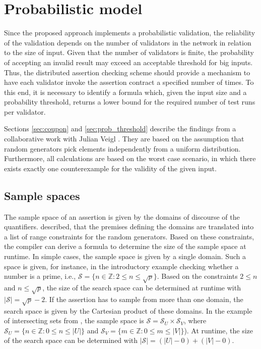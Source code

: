 \chapter{Probabilistic model}\label{chap:prob_model}
Since the proposed approach implements a probabilistic validation, the reliability of the validation depends on the number of validators in the network in relation to the size of input. Given that the number of validators is finite, the probability of accepting an invalid result may exceed an acceptable threshold for big inputs. Thus, the distributed assertion checking scheme should provide a mechanism to have each validator invoke the assertion contract a specified number of times. To this end, it is necessary to identify a formula which, given the input size and a probability threshold, returns a lower bound for the required number of test runs per validator. 

Sections \ref{sec:coupon} and \ref{sec:prob_threshold} describe the findings from a collaborative work with Julian Veigl \cite{bernhardt_veigel_2020}. They are based on the assumption that random generators pick elements independently from a uniform distribution. Furthermore, all calculations are based on the worst case scenario, in which there exists exactly one counterexample for the validity of the given input.

\section{Sample spaces}
The sample space of an assertion is given by the domains of discourse of the quantifiers.  described, that the premises defining the domains are translated into a list of range constraints for the random generators. Based on these constraints, the compiler can derive a formula to determine the size of the sample space at runtime. In simple cases, the sample space is given by a single domain. Such a space is given, for instance, in the introductory example checking whether a number is a prime, i.e., $\mathcal{S} = \lbrace n \in\mathbb{Z} : 2 \le n \le \sqrt{p} \rbrace$. Based on the constraints $2 \le n$ and $n \le \sqrt{p}$, the size of the search space can be determined at runtime with $|\mathcal{S}| = \sqrt{p} - 2$. If the assertion has to sample from more than one domain, the search space is given by the Cartesian product of these domains. In the example of intersecting sets from , the sample space is $\mathcal{S} = \mathcal{S}_U \times \mathcal{S}_V$, where $\mathcal{S}_U = \lbrace n \in\mathbb{Z} : 0 \leq n \le |U| \rbrace$ and $\mathcal{S}_V = \lbrace m \in\mathbb{Z} : 0 \leq m \le |V| \rbrace$). At runtime, the size of the search space can be determined with $|\mathcal{S}| = (|U| - 0) + (|V| - 0)$.

